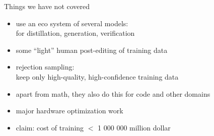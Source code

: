 \documentclass[11pt,compress,t,notes=noshow, xcolor=table]{beamer}
\begin{document}
\begin{frame}{Things we have not covered}

\vfill

\begin{itemize}
\item use an eco system of several models:\\
for distillation, generation, verification
\item some ``light'' human post-editing of training data
\item rejection sampling:\\ keep only high-quality,
    high-confidence training data
\item apart from math, they also do this for code and other domains
\item major hardware optimization work
\item claim: cost of training $<$ 1 000 000 million dollar
\end{itemize}

\vfill

\end{frame}



\endlecture
\end{document}
